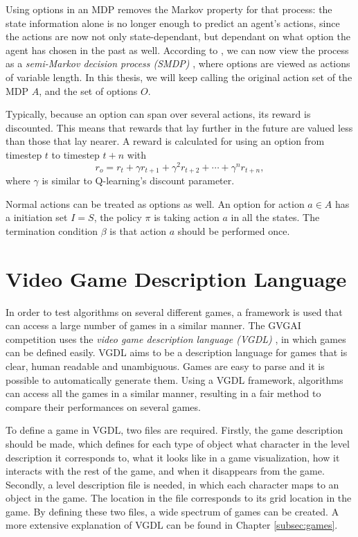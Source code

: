 Using options in an MDP removes the Markov property for that process: the state
information alone is no longer enough to predict an agent's actions, since the
actions are now not only state-dependant, but dependant on what option the agent
has chosen in the past as well. According to \cite{sutton1999between}, we can
now view the process as a \emph{semi-Markov decision process (SMDP)}
\cite{duff1995reinforcement}, where options are viewed as actions of variable
length. In this thesis, we will keep calling the original action set of the MDP
$A$, and the set of options $O$.  

Typically, because an option can span over several actions, its reward is
discounted. This means that rewards that lay further in the future are valued
less than those that lay nearer. A reward is calculated for using an option from
timestep $t$ to timestep $t+n$ with
\begin{equation}
	\label{eq:option-reward}
	r_o = r_{t} + \gamma r_{t+1} + \gamma^2 r_{t+2} + \cdots + \gamma^n r_{t+n},
\end{equation}
where $\gamma$ is similar to Q-learning's discount parameter.

Normal actions can be treated as options as
well.  An option for action $a \in A$ has a initiation set $I = S$, the policy
$\pi$ is taking action $a$ in all the states.  The termination condition $\beta$
is that action $a$ should be performed once. 

\section{Video Game Description Language}
\label{subsec:vgdl}
In order to test algorithms on several different games, a framework is used that
can access a large number of games in a similar manner. The GVGAI competition
uses the \emph{video game description language (VGDL)} \cite{schaul2013video},
in which games can be defined easily. VGDL aims to be a description language
for games that is clear, human readable and unambiguous. Games are easy to parse
and it is possible to automatically generate them. Using a VGDL framework,
algorithms can access all the games in a similar manner, resulting in a fair
method to compare their performances on several games.

To define a game in VGDL, two files are required. Firstly, the game description
should be made, which defines for each type of object what character in the
level description it corresponds to, what it looks like in a game visualization,
how it interacts with the rest of the game, and when it disappears from the
game. Secondly, a level description file is needed, in which each character maps
to an object in the game. The location in the file corresponds to its grid
location in the game. By defining these two files, a wide spectrum of games
can be created. A more extensive explanation of VGDL can be found in Chapter
\ref{subsec:games}.

